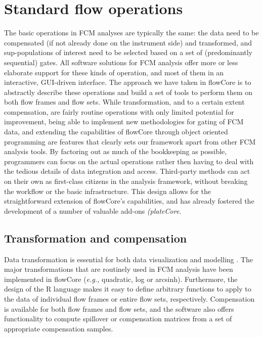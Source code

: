 \documentclass[12pt]{article}
\begin{document}
\section*{Standard flow operations}
The basic operations in FCM analyses are typically the same: the data
need to be compensated (if not already done on the instrument side)
and transformed, and sup-populations of interest need to be selected
based on a set of (predominantly sequential) gates. All software
solutions for FCM analysis offer more or less elaborate support for
these kinds of operation, and most of them in an interactive,
GUI-driven interface. The approach we have taken in flowCore is to
abstractly describe these operations and build a set of tools to
perform them on both flow frames and flow sets. While transformation,
and to a certain extent compensation, are fairly routine operations
with only limited potential for improvement, being able to implement
new methodologies for gating of FCM data, and extending the
capabilities of flowCore through object oriented programming are
features that clearly sets our framework apart from other FCM analysis
tools. By factoring out as much of the bookkeeping as possible,
programmers can focus on the actual operations rather then having to
deal with the tedious details of data integration and
access. Third-party methods can act on their own as first-class
citizens in the analysis framework, without breaking the workflow or
the basic infrastructure. This design allows for the straightforward
extension of flowCore's capabilities, and has already fostered the
development of a number of valuable add-ons
\citep{lo2008agf,sarkar2008ufv} \textit{(plateCore}.




\subsection*{Transformation and compensation}
Data transformation is essential for both data visualization and
modelling \citep{lo2008agf}. The major transformations that are
routinely used in FCM analysis have been implemented in flowCore
(\textit{e.g.,} quadratic, log or arcsinh). Furthermore, the design of the R language makes
it easy to define arbitrary functions to apply to the data of
individual flow frames or entire flow sets, respectively. Compensation
is available for both flow frames and flow sets, and the software also
offers functionality to compute spillover or compensation matrices
from a set of appropriate compensation samples.
\end{document}
